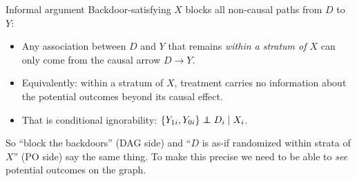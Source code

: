 \documentclass[xcolor=dvipsnames]{beamer}
\newcommand\indep{\protect\mathpalette{\protect\independenT}{\perp}}
\def\independenT#1#2{\mathrel{\rlap{$#1#2$}\mkern2mu{#1#2}}}
\begin{document}
\begin{frame}{Informal argument}
\small
{} Backdoor-satisfying $X$ blocks all non-causal paths from $D$ to $Y$:
\begin{itemize}
\footnotesize
\item<2-> Any association between $D$ and $Y$ that remains \textit{within a stratum of $X$} can only come from the causal arrow $D \to Y$.
\item<3-> Equivalently: within a stratum of $X$, treatment carries no information about the potential outcomes beyond its causal effect.
\item<4-> That is conditional ignorability: $\{Y_{1i}, Y_{0i}\} \indep D_i \mid X_i$.
\end{itemize}

\bigskip
{} So ``block the backdoors'' (DAG side) and ``$D$ is as-if randomized within strata of $X$'' (PO side) say the same thing.  To make this precise we need to be able to \textit{see} potential outcomes on the graph.
\end{frame}
\end{document}
